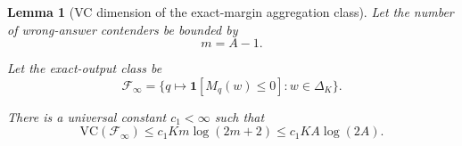 \documentclass{article} %
\newtheorem{lemma}[theorem]{Lemma}
\providecommand{\simplex}{\Delta_K}
\providecommand{\Fcal}{\mathcal{F}}
\providecommand{\VC}{\mathrm{VC}}
\begin{document}
\begin{lemma}[VC dimension of the exact-margin aggregation class]
\label{lem:vc}
Let the number of wrong-answer contenders be bounded by
\begin{equation}
\label{eq:lem1-m}
m = A-1 .
\end{equation}

Let the exact-output class be
\begin{equation}
\label{eq:lem1-class}
\Fcal_\infty
=
\Big\{
q\mapsto \mathbf 1[M_q(w)\le 0] : w\in\simplex
\Big\}.
\end{equation}

There is a universal constant \(c_1<\infty\) such that
\begin{equation}
\label{eq:pf1-vc}
\VC(\Fcal_\infty)
\le
c_1 K m\log(2m+2)
\le
c_1 K A\log(2A).
\end{equation}
\end{lemma}
\end{document}
